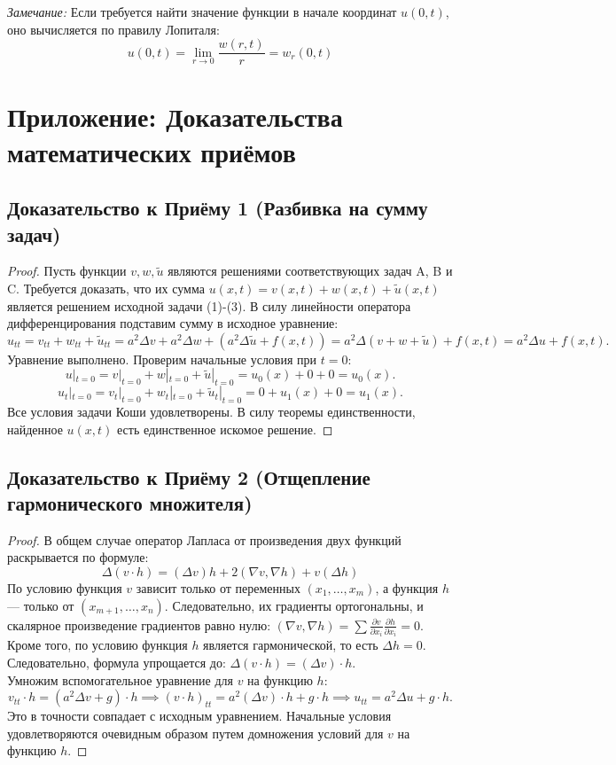 \vspace{0.2cm}
\noindent\textit{Замечание:} Если требуется найти значение функции в начале координат $u(0,t)$, оно вычисляется по правилу Лопиталя:
\[
u(0,t) = \lim_{r \to 0} \frac{w(r,t)}{r} = w_r(0,t)
\]

\newpage
\appendix
\section{Приложение: Доказательства математических приёмов}

\subsection*{Доказательство к Приёму 1 (Разбивка на сумму задач)}
\begin{proof}
Пусть функции $v, w, \tilde{u}$ являются решениями соответствующих задач A, B и C. Требуется доказать, что их сумма $u(x,t) = v(x,t) + w(x,t) + \tilde{u}(x,t)$ является решением исходной задачи (1)-(3).
В силу линейности оператора дифференцирования подставим сумму в исходное уравнение:
\[
u_{tt} = v_{tt} + w_{tt} + \tilde{u}_{tt} = a^2\Delta v + a^2\Delta w + (a^2\Delta \tilde{u} + f(x,t)) = a^2\Delta(v+w+\tilde{u}) + f(x,t) = a^2\Delta u + f(x,t).
\]
Уравнение выполнено. Проверим начальные условия при $t=0$:
\[
u|_{t=0} = v|_{t=0} + w|_{t=0} + \tilde{u}|_{t=0} = u_0(x) + 0 + 0 = u_0(x).
\]
\[
u_t|_{t=0} = v_t|_{t=0} + w_t|_{t=0} + \tilde{u}_t|_{t=0} = 0 + u_1(x) + 0 = u_1(x).
\]
Все условия задачи Коши удовлетворены. В силу теоремы единственности, найденное $u(x,t)$ есть единственное искомое решение.
\end{proof}

\subsection*{Доказательство к Приёму 2 (Отщепление гармонического множителя)}
\begin{proof}
В общем случае оператор Лапласа от произведения двух функций раскрывается по формуле:
\[ \Delta(v \cdot h) = (\Delta v)h + 2(\nabla v, \nabla h) + v(\Delta h) \]
По условию функция $v$ зависит только от переменных $(x_1, \dots, x_m)$, а функция $h$ — только от $(x_{m+1}, \dots, x_n)$. Следовательно, их градиенты ортогональны, и скалярное произведение градиентов равно нулю: $(\nabla v, \nabla h) = \sum \frac{\partial v}{\partial x_i}\frac{\partial h}{\partial x_i} = 0$. 
Кроме того, по условию функция $h$ является гармонической, то есть $\Delta h = 0$. 
Следовательно, формула упрощается до: $\Delta(v \cdot h) = (\Delta v) \cdot h$. \\
Умножим вспомогательное уравнение для $v$ на функцию $h$:
\[
v_{tt} \cdot h = (a^2\Delta v + g) \cdot h \implies (v \cdot h)_{tt} = a^2(\Delta v) \cdot h + g \cdot h \implies u_{tt} = a^2\Delta u + g \cdot h.
\]
Это в точности совпадает с исходным уравнением. Начальные условия удовлетворяются очевидным образом путем домножения условий для $v$ на функцию $h$.
\end{proof}

